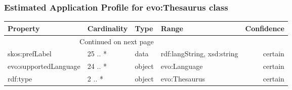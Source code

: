 \documentclass[10pt,a4paper,titlepage,final]{article}
\begin{document}
\subsubsection{Estimated Application Profile for evo:Thesaurus class}
\begin{tabularx}{\textwidth}{lllXr}
\toprule
              Property & Cardinality &    Type &                       Range & Confidence \\
\midrule
\endhead
\midrule
\multicolumn{3}{r}{{Continued on next page}} \\
\midrule
\endfoot

\bottomrule
\endlastfoot
        skos:prefLabel &     25 .. * &    data &  rdf:langString, xsd:string &    certain \\
 evo:supportedLanguage &     24 .. * &  object &                evo:Language &    certain \\
              rdf:type &      2 .. * &  object &               evo:Thesaurus &    certain \\
\end{tabularx}
\end{document}
